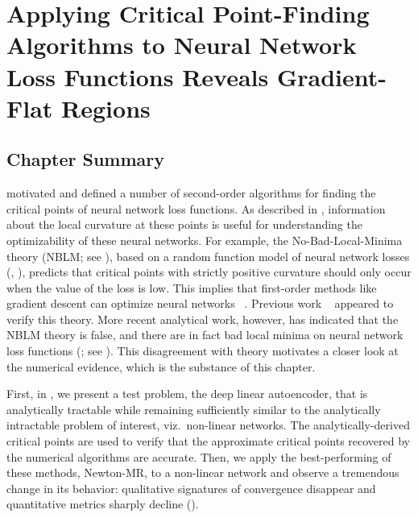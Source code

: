 \documentclass[../../thesis.tex]{subfiles}
\begin{document}
\chapter{Applying Critical Point-Finding Algorithms to Neural Network Loss Functions
Reveals Gradient-Flat Regions}

\onlyinsubfile{\begin{KeepFromToc}
		\tableofcontents
		\listoffigures
		\listofalgorithms{}
	\end{KeepFromToc}}
\onlyinsubfile{\clearpage}
\onlyinsubfile{\linenumbers}

\section{Chapter Summary}%

 motivated and defined
a number of second-order algorithms
for finding the critical points of neural network loss functions.
As described in ,
information about the local curvature at these points is useful
for understanding the optimizability of these neural networks.
For example, the No-Bad-Local-Minima theory
(NBLM\@; see ),
based on a random function model of neural network losses
(, ),
predicts that critical points with strictly positive curvature
should only occur when the value of the loss is low.
This implies that first-order methods like gradient descent
can optimize neural networks%
~\cite{jin2018a}.
Previous work%
~\cite{dauphin2014,pennington2017}
appeared to verify this theory.
More recent analytical work, however,
has indicated that the NBLM theory is false,
and there are in fact bad local minima
on neural network loss functions
(\cite{ding2019}; see ).
This disagreement with theory
motivates a closer look at the numerical evidence,
which is the substance of this chapter.

First, in ,
we present a test problem,
the deep linear autoencoder,
that is analytically tractable
while remaining sufficiently similar
to the analytically intractable problem
of interest, viz.~non-linear networks.
The analytically-derived critical points
are used to verify that the approximate critical points
recovered by the numerical algorithms are accurate.
Then, we apply the best-performing of these methods,
Newton-MR, to a non-linear network
and observe a tremendous change in its behavior:
qualitative signatures of convergence disappear
and quantitative metrics sharply decline
().
\end{document}
